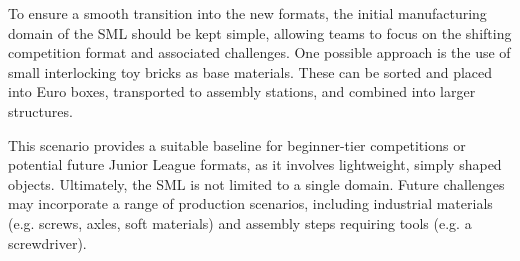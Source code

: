 \documentclass[letterpaper, 11pt]{extarticle}
\begin{document}
To ensure a smooth transition into the new formats, the initial manufacturing domain of the SML should be kept simple, allowing teams to focus on the shifting competition format and associated challenges.
One possible approach is the use of small interlocking toy bricks as base materials.
These can be sorted and placed into Euro boxes, transported to assembly stations, and combined into larger structures.

This scenario provides a suitable baseline for beginner-tier competitions or potential future Junior League formats, as it involves lightweight, simply shaped objects. Ultimately, the SML is not limited to a single domain.
Future challenges may incorporate a range of production scenarios, including industrial materials (e.g. screws, axles, soft materials) and assembly steps requiring tools (e.g. a screwdriver).








\end{document}
